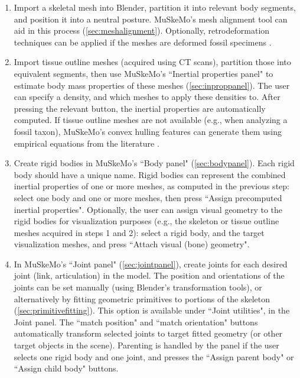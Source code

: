 \documentclass{article}
\begin{document}
\begin{enumerate}
\item Import a skeletal mesh into Blender, partition it into relevant body segments, and position it into a neutral posture. MuSkeMo's mesh alignment tool can aid in this process (\ref{sec:meshalignment}). Optionally, retrodeformation techniques can be applied if the meshes are deformed fossil specimens \cite{herbstToolboxRetrodeformationMuscle2022}.
 \item Import tissue outline meshes (acquired using CT scans), partition those into equivalent segments, then use MuSkeMo's ``Inertial properties panel" to estimate body mass properties of these meshes (\ref{sec:inproppanel}). The user can specify a density, and which meshes to apply these densities to. After pressing the relevant button, the inertial properties are automatically computed. If tissue outline meshes are not available (e.g., when analyzing a fossil taxon), MuSkeMo's convex hulling features can generate them using empirical equations from the literature \cite{sellersMinimumConvexHull2012,macaulayDecouplingBodyShape2023,coathamConvexHullEstimation2021}.
\item	Create rigid bodies in MuSkeMo's ``Body panel" (\ref{sec:bodypanel}).  Each rigid body should have a unique name. Rigid bodies can represent the combined inertial properties of one or more meshes, as computed in the previous step: select one body and one or more meshes, then press ``Assign precomputed inertial properties". Optionally, the user can assign visual geometry to the rigid bodies for visualization purposes (e.g., the skeleton or tissue outline meshes acquired in steps 1 and 2): select a rigid body, and the target visualization meshes, and press ``Attach visual (bone) geometry".
\item	In MuSkeMo's ``Joint panel" (\ref{sec:jointpanel}), create joints for each desired joint (link, articulation) in the model. The position and orientations of the joints can be set manually (using Blender's transformation tools), or alternatively by fitting geometric primitives to portions of the skeleton (\ref{sec:primitivefitting}). This option is available under ``Joint utilities", in the Joint panel. The ``match position" and ``match orientation" buttons automatically transform selected joints to target fitted geometry (or other target objects in the scene). Parenting is handled by the panel if the user selects one rigid body and one joint, and presses the ``Assign parent body" or ``Assign child body" buttons.

\end{enumerate}
\end{document}
